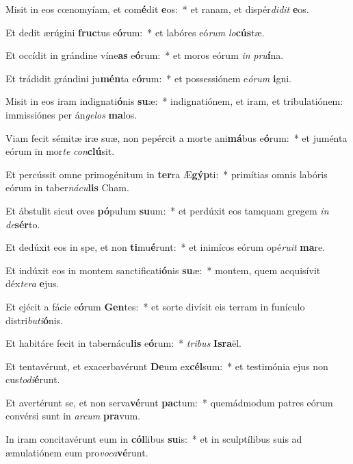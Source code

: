 \item Misit in eos cœnomyíam, et com\textbf{é}dit \textbf{e}os:~* et ranam, et dispér\textit{di}\textit{dit} \textbf{e}os.
\item Et dedit ærúgini \textbf{fruc}tus e\textbf{ó}rum:~* et labóres eó\textit{rum} \textit{lo}\textbf{cús}tæ.
\item Et occídit in grándine víne\textbf{as} e\textbf{ó}rum:~* et moros eórum \textit{in} \textit{pru}\textbf{í}na.
\item Et trádidit grándini ju\textbf{mén}ta e\textbf{ó}rum:~* et possessiónem e\textit{ó}\textit{rum} \textbf{i}gni.
\item Misit in eos iram indignati\textbf{ó}nis \textbf{su}æ:~* indignatiónem, et iram, et tribulatiónem: immissiónes per án\textit{ge}\textit{los} \textbf{ma}los.
\item Viam fecit sémitæ iræ suæ, non pepércit a morte ani\textbf{má}bus e\textbf{ó}rum:~* et juménta eórum in mor\textit{te} \textit{con}\textbf{clú}sit.
\item Et percússit omne primogénitum in \textbf{ter}ra Æ\textbf{gýp}ti:~* primítias omnis labóris eórum in taber\textit{ná}\textit{cu}\textbf{lis} Cham.
\item Et ábstulit sicut oves \textbf{pó}pulum \textbf{su}um:~* et perdúxit eos tamquam gregem \textit{in} \textit{de}\textbf{sér}to.
\item Et dedúxit eos in spe, et non \textbf{ti}mu\textbf{é}runt:~* et inimícos eórum opé\textit{ru}\textit{it} \textbf{ma}re.
\item Et indúxit eos in montem sanctificati\textbf{ó}nis \textbf{su}æ:~* montem, quem acquisívit déx\textit{te}\textit{ra} \textbf{e}jus.
\item Et ejécit a fácie e\textbf{ó}rum \textbf{Gen}tes:~* et sorte divísit eis terram in funículo distri\textit{bu}\textit{ti}\textbf{ó}nis.
\item Et habitáre fecit in tabernácu\textbf{lis} e\textbf{ó}rum:~* \textit{tri}\textit{bus} \textbf{Is}\textbf{ra}ël.
\item Et tentavérunt, et exacerbavérunt \textbf{De}um ex\textbf{cél}sum:~* et testimónia ejus non cus\textit{to}\textit{di}\textbf{é}runt.
\item Et avertérunt se, et non serva\textbf{vé}runt \textbf{pac}tum:~* quemádmodum patres eórum convérsi sunt in \textit{ar}\textit{cum} \textbf{pra}vum.
\item In iram concitavérunt eum in \textbf{cól}libus \textbf{su}is:~* et in sculptílibus suis ad æmulatiónem eum pro\textit{vo}\textit{ca}\textbf{vé}runt.
